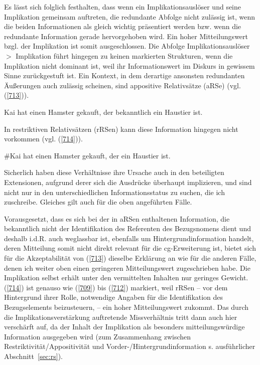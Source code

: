Es lässt sich folglich festhalten, dass wenn ein Implikationsauslöser und seine Implikation gemeinsam auftreten, die redundante Abfolge nicht zulässig ist, wenn die beiden Informationen als \glq gleich wichtig\grq {} präsentiert werden bzw. wenn die redundante Information gerade hervorgehoben wird. Ein hoher Mitteilungswert bzgl. der Implikation ist somit ausgeschlossen. Die Abfolge Implikationsauslöser $>$ Implikation führt hingegen zu keinen markierten Strukturen, wenn die Implikation nicht dominant ist, weil ihr Informationswert im Diskurs in gewissem Sinne zurückgestuft ist. Ein Kontext, in dem derartige ansonsten redundanten Äußerungen auch zulässig scheinen, sind appositive Relativsätze  (aRSe) (vgl. (\ref{713})).
\begin{exe}
	\ex\label{713} 
	Kai hat einen Hamster gekauft, der bekanntlich ein Haustier ist.
\end{exe}
In restriktiven Relativsätzen  (rRSen) kann diese Information hingegen nicht vor\-kommen (vgl. (\ref{714})).
\begin{exe}
	\ex\label{714} 
	\#Kai hat einen Hamster gekauft, der ein Haustier ist.
\end{exe}
Sicherlich haben diese Verhältnisse ihre Ursache auch in den beteiligten Extensionen, aufgrund derer sich die Ausdrücke überhaupt implizieren, und sind nicht nur in den unterschiedlichen Informationsstatus zu suchen, die ich zuschreibe. Gleiches gilt auch für die oben angeführten Fälle.

Vorausgesetzt, dass es sich bei der in aRSen enthaltenen Information, die be\-kanntlich nicht der Identifikation des Referenten des Bezugsnomens dient und des\-halb i.d.R. auch weglassbar ist, ebenfalls um Hintergrundinformation handelt, deren Mitteilung somit nicht direkt relevant für die cg-Erweiterung ist, bietet sich für die Akzeptabilität von (\ref{713}) dieselbe Erklärung an wie für die anderen Fälle, denen ich weiter oben einen geringeren Mitteilungswert zugeschrieben habe. Die Implikation selbst erhält unter den vermittelten Inhalten nur geringes Gewicht. (\ref{714}) ist genauso wie (\ref{709}) bis (\ref{712}) markiert, weil rRSen – vor dem Hintergrund ihrer Rolle, notwendige Angaben für die Identifikation des Bezugselements beizusteuern, – ein hoher Mitteilungswert zukommt. Das durch die Implikationsverstärkung auftretende Missverhältnis tritt dann auch hier verschärft auf, da der Inhalt der Implikation als besonders mitteilungswürdige Information ausgegeben wird (zum Zusammenhang zwischen Restriktivität/Appositivität und Vorder-/Hintergrundinformation s. ausführlicher Abschnitt~\ref{sec:rs}).

